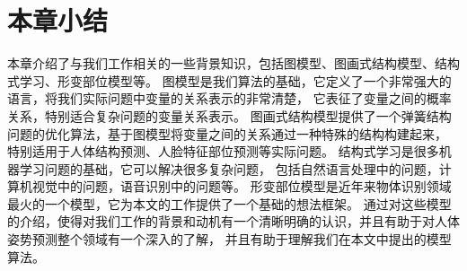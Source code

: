 \section{本章小结}
本章介绍了与我们工作相关的一些背景知识，包括图模型、图画式结构模型、结构式学习、形变部位模型等。
图模型是我们算法的基础，它定义了一个非常强大的语言，将我们实际问题中变量的关系表示的非常清楚，
它表征了变量之间的概率关系，特别适合复杂问题的变量关系表示。
图画式结构模型提供了一个弹簧结构问题的优化算法，基于图模型将变量之间的关系通过一种特殊的结构构建起来，
特别适用于人体结构预测、人脸特征部位预测等实际问题。
结构式学习是很多机器学习问题的基础，它可以解决很多复杂问题，
包括自然语言处理中的问题，计算机视觉中的问题，语音识别中的问题等。
形变部位模型是近年来物体识别领域最火的一个模型，它为本文的工作提供了一个基础的想法框架。
通过对这些模型的介绍，使得对我们工作的背景和动机有一个清晰明确的认识，并且有助于对人体姿势预测整个领域有一个深入的了解，
并且有助于理解我们在本文中提出的模型算法。
